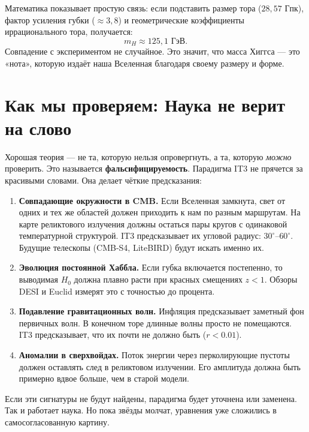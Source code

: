 \documentclass[12pt,a4paper,oneside]{book}
\begin{document}
Математика показывает простую связь: если подставить размер тора ($28{,}57$ Гпк), фактор усиления губки ($\approx 3{,}8$) и геометрические коэффициенты иррационального тора, получается:
\[
m_H \approx 125{,}1 \text{ ГэВ}.
\]
Совпадение с экспериментом не случайное. Это значит, что масса Хиггса — это «нота», которую издаёт наша Вселенная благодаря своему размеру и форме.

\chapter{Как мы проверяем: Наука не верит на слово}

Хорошая теория — не та, которую нельзя опровергнуть, а та, которую \textit{можно} проверить. Это называется \textbf{фальсифицируемость}. Парадигма IT3 не прячется за красивыми словами. Она делает чёткие предсказания:

\begin{enumerate}
    \item \textbf{Совпадающие окружности в CMB.} Если Вселенная замкнута, свет от одних и тех же областей должен приходить к нам по разным маршрутам. На карте реликтового излучения должны остаться пары кругов с одинаковой температурной структурой. IT3 предсказывает их угловой радиус: $30^\circ$–$60^\circ$. Будущие телескопы (CMB-S4, LiteBIRD) будут искать именно их.
    
    \item \textbf{Эволюция постоянной Хаббла.} Если губка включается постепенно, то выводимая $H_0$ должна плавно расти при красных смещениях $z < 1$. Обзоры DESI и Euclid измерят это с точностью до процента.
    
    \item \textbf{Подавление гравитационных волн.} Инфляция предсказывает заметный фон первичных волн. В конечном торе длинные волны просто не помещаются. IT3 предсказывает, что их почти не должно быть ($r < 0.01$).
    
    \item \textbf{Аномалии в сверхвойдах.} Поток энергии через перколирующие пустоты должен оставлять след в реликтовом излучении. Его амплитуда должна быть примерно вдвое больше, чем в старой модели.
\end{enumerate}

Если эти сигнатуры не будут найдены, парадигма будет уточнена или заменена. Так и работает наука. Но пока звёзды молчат, уравнения уже сложились в самосогласованную картину.
\end{document}
